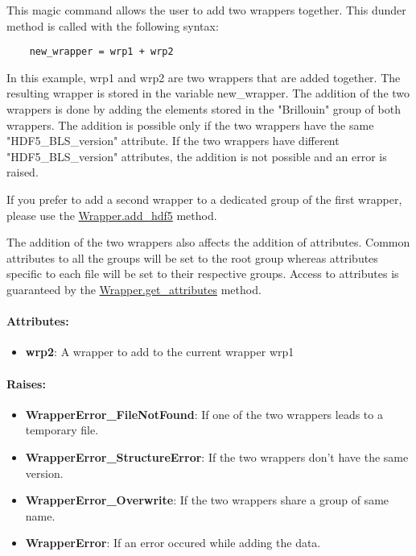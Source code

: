 This magic command allows the user to add two wrappers together. This dunder method is called with the following syntax:
\begin{lstlisting}
    new_wrapper = wrp1 + wrp2
\end{lstlisting}

In this example, wrp1 and wrp2 are two wrappers that are added together. The resulting wrapper is stored in the variable new\_wrapper. The addition of the two wrappers is done by adding the elements stored in the "Brillouin" group of both wrappers. The addition is possible only if the two wrappers have the same "HDF5\_BLS\_version" attribute. If the two wrappers have different "HDF5\_BLS\_version" attributes, the addition is not possible and an error is raised.

If you prefer to add a second wrapper to a dedicated group of the first wrapper, please use the \hyperref[subsec:wrapper.add_hdf5]{Wrapper.add\_hdf5} method.

The addition of the two wrappers also affects the addition of attributes. Common attributes to all the groups will be set to the root group whereas attributes specific to each file will be set to their respective groups. Access to attributes is guaranteed by the \hyperref[subsec:wrapper.get_attributes]{Wrapper.get\_attributes} method.

\paragraph{Attributes:}

\begin{itemize}
    \item \textbf{wrp2}: A wrapper to add to the current wrapper wrp1
\end{itemize}

\paragraph{Raises:}

\begin{itemize}
    \item \textbf{WrapperError\_FileNotFound}: If one of the two wrappers leads to a temporary file.
    \item \textbf{WrapperError\_StructureError}: If the two wrappers don't have the same version.
    \item \textbf{WrapperError\_Overwrite}: If the two wrappers share a group of same name.
    \item \textbf{WrapperError}: If an error occured while adding the data.
\end{itemize}

